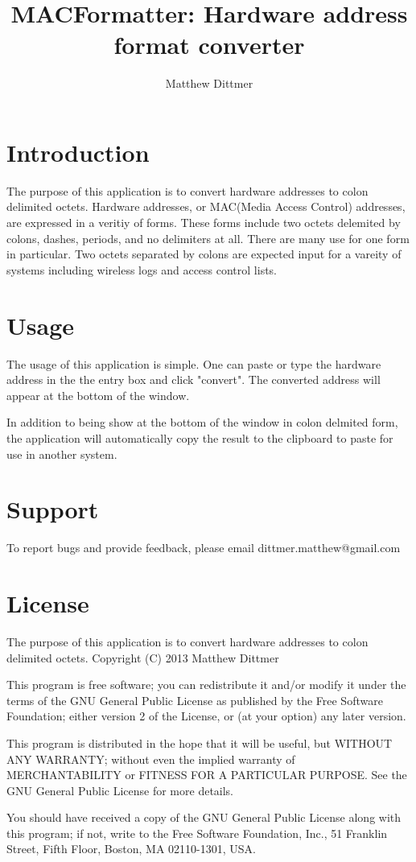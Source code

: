 \documentclass[10pt,a4paper,draft]{report}
\author{Matthew Dittmer}
\title{MACFormatter: Hardware address format converter}
\begin{document}
\maketitle
\chapter*{Introduction}

The purpose of this application is to convert hardware addresses to colon delimited octets.  Hardware addresses, or MAC(Media Access Control) addresses, are expressed in a veritiy of forms.  These forms include two octets delemited by colons, dashes, periods, and no delimiters at all.  There are many use for one form in particular.  Two octets separated by colons are expected input for a vareity of systems including wireless logs and access control lists.

\chapter*{Usage}

The usage of this application is simple.  One can paste or type the hardware address in the the entry box and click "convert".  The converted address will appear at the bottom of the window.

In addition to being show at the bottom of the window in colon delmited form, the application will automatically copy the result to the clipboard to paste for use in another system.

\chapter*{Support}

To report bugs and provide feedback, please email dittmer.matthew@gmail.com

\chapter*{License}

The purpose of this application is to convert hardware addresses to colon delimited octets.
Copyright (C) 2013  Matthew Dittmer

This program is free software; you can redistribute it and/or
modify it under the terms of the GNU General Public License
as published by the Free Software Foundation; either version 2
of the License, or (at your option) any later version.

This program is distributed in the hope that it will be useful,
but WITHOUT ANY WARRANTY; without even the implied warranty of
MERCHANTABILITY or FITNESS FOR A PARTICULAR PURPOSE.  See the
GNU General Public License for more details.

You should have received a copy of the GNU General Public License
along with this program; if not, write to the Free Software
Foundation, Inc., 51 Franklin Street, Fifth Floor, Boston, MA  02110-1301, USA.
\end{document}

